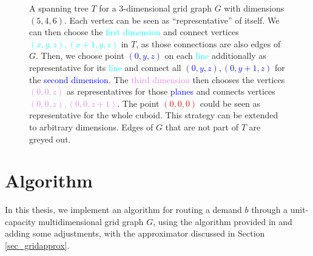 \begin{figure}
\caption{A spanning tree $T$ for a $3$-dimensional grid graph $G$ with dimensions $(5,4,6)$. Each vertex can be seen as ``representative'' of itself. We can then choose the \textcolor{cyan}{first dimension} and connect vertices \textcolor{cyan}{$(x,y,z),(x+1,y,z)$} in $T$, as those connections are also edges of $G$. Then, we choose point \textcolor{blue}{$(0,y,z)$} on each \textcolor{cyan}{line} additionally as representative for its \textcolor{cyan}{line} and connect all \textcolor{blue}{$(0,y,z),(0,y+1,z)$} for the \textcolor{blue}{second dimension}. The \textcolor{violet}{third dimension} then chooses the vertices \textcolor{violet}{$(0,0,z)$} as representatives for those \textcolor{blue}{planes} and connects vertices \textcolor{violet}{$(0,0,z),(0,0,z+1)$}. The point \textcolor{red}{$(0,0,0)$} could be seen as representative for the whole cuboid. This strategy can be extended to arbitrary dimensions. Edges of $G$ that are not part of $T$ are \textcolor{gray!70}{greyed out}.}
\label{ex_mst}
\end{figure}
\chapter{Algorithm}
In this thesis, we implement an algorithm for routing a demand $b$ through a unit-capacity multidimensional grid graph $G$, using the algorithm provided in \cite{nmfnlt} and adding some adjustments, with the approximator discussed in Section \ref{sec_gridapprox}.

